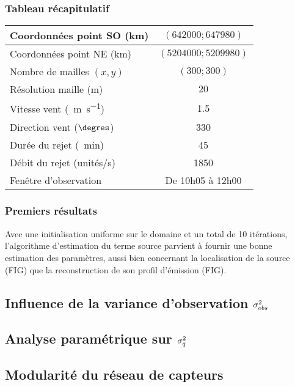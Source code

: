 \subsubsection{Tableau récapitulatif}

\begin{center}
	\begin{tabular}{| l || c | }
		\hline			
		Coordonnées point SO (km) & $(642000;647980)$  \\
		\hline
		Coordonnées point NE (km) & $(5204000;5209980)$ \\
		\hline
		Nombre de mailles $(x,y)$ & $(300;300)$ \\
		\hline
		Résolution maille (m) & $20$ \\
		\hline
		Vitesse vent (\SI{}{\meter\per\second}) & 1.5 \\
		\hline
		Direction vent ($\degres$) & 330 \\
		\hline
		Durée du rejet (\SI{}{\minute}) & 45 \\
		\hline
		Débit du rejet (unités/s) & 1850 \\
		\hline
		Fenêtre d'observation & De 10h05 à 12h00 \\
		\hline
	\end{tabular}
\end{center}

\subsubsection{Premiers résultats}

Avec une initialisation uniforme sur le domaine et un total de 10 itérations, l'algorithme d'estimation du terme source parvient à fournir une bonne estimation des paramètres, aussi bien concernant la localisation de la source (FIG) que la reconstruction de son profil d'émission (FIG).\\




\subsection{Influence de la variance d'observation ${\sigma_{obs}^2}$}

\subsection{Analyse paramétrique sur $\sigma_q^2$}

\subsection{Modularité du réseau de capteurs}

